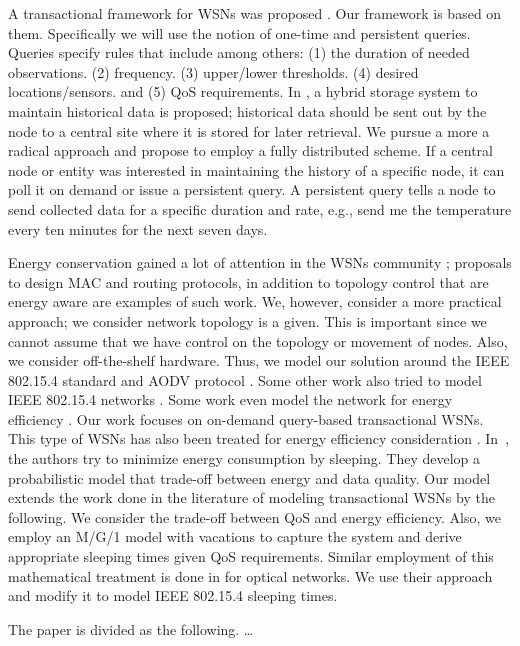 A transactional framework for WSNs was proposed \cite{2, 24}. Our framework is based on them. Specifically we will use the notion of one-time and persistent queries. Queries specify rules that include among others: (1) the duration of needed observations. (2) frequency. (3) upper/lower thresholds. (4) desired locations/sensors. and (5) QoS requirements. In \cite{2}, a hybrid storage system to maintain historical data is proposed; historical data should be sent out by the node to a central site where it is stored for later retrieval. We pursue a more a radical approach and propose to employ a fully distributed scheme. If a central node or entity was interested in maintaining the history of a specific node, it can poll it on demand or issue a persistent query. A persistent query tells a node to send collected data for a specific duration and rate, e.g., send me the temperature every ten minutes for the next seven days.

Energy conservation gained a lot of attention in the WSNs community \cite{1,5,6,7}; proposals to design MAC and routing protocols, in addition to topology control that are energy aware are examples of such work. We, however, consider a more practical approach; we consider network topology is a given. This is important since we cannot assume that we have control on the topology or movement of nodes. Also, we consider off-the-shelf hardware. Thus, we model our solution around the IEEE 802.15.4 standard and AODV protocol \cite{aodv}. Some other work also tried to model IEEE 802.15.4 networks \cite{8,9,10,4.11,12,13}. Some work even model the network for energy efficiency \cite{10,12,13}. Our work focuses on on-demand query-based transactional WSNs. This type of WSNs has also been treated for energy efficiency consideration \cite{14,25}. In~\cite{25}, the authors try to minimize energy consumption by sleeping. They develop a probabilistic model that trade-off between energy and data quality. Our model extends the work done in the literature of modeling transactional WSNs by the following. We consider the trade-off between QoS and energy efficiency. Also, we employ an M/G/1 model with vacations to capture the system and derive appropriate sleeping times given QoS requirements. Similar employment of this mathematical treatment is done in \cite{15} for optical networks. We use their approach and modify it to model IEEE 802.15.4 sleeping times.

The paper is divided as the following. \ldots